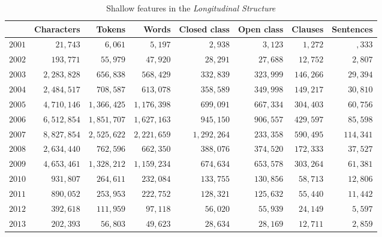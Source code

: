 \begin{table}[htb]
\centering
\small
\begin{tabular}{lrrrrrrr}
\toprule
{} &  Characters &   Tokens &    Words &  Closed class &  Open class &  Clauses &  Sentences \\
\midrule
$2001$ &    $   21,743$ &  $   6,061  $ &  $    5,197   $ &    $    2,938$  &   $     3,123$ &   $  1,272$ &  $   ,333 $  \\
$2002$ &    $  193,771$ &  $  55,979  $ &  $   47,920   $ &    $   28,291$  &   $    27,688$ &   $ 12,752$ &  $  2,807$  \\
$2003$ &    $ 2,283,828$ & $ 656,838  $ &  $  568,429   $ &    $  332,839$  &   $   323,999$ &   $146,266$ &  $ 29,394$  \\
$2004$ &    $ 2,484,517$ & $ 708,587  $ &  $  613,078   $ &    $  358,589$  &   $   349,998$ &   $149,217$ &  $ 30,810$  \\
$2005$ &    $ 4,710,146$ & $1,366,425 $ &  $  1,176,398  $ &    $   699,091$  &   $   667,334$ &   $304,403$ &  $ 60,756$  \\
$2006$ &    $ 6,512,854$ & $1,851,707 $ &  $  1,627,163  $ &    $   945,150$  &   $   906,557$ &   $429,597$ &  $ 85,598$  \\
$2007$ &    $ 8,827,854$ & $2,525,622 $ &  $  2,221,659  $ &    $  1,292,264$  &   $   233,358$ &   $590,495$ &  $114,341$  \\
$2008$ &    $ 2,634,440$ & $ 762,596  $ &  $  662,350   $ &    $  388,076$  &   $   374,520$ &   $172,333$ &  $ 37,527$  \\
$2009$ &    $ 4,653,461$ & $1,328,212 $ &  $  1,159,234  $ &    $   674,634$  &   $   653,578$ &   $303,264$ &  $ 61,381$  \\
$2010$ &    $  931,807$ &  $ 264,611  $ &  $  232,084   $ &    $  133,755$  &   $   130,856$ &   $ 58,713$ &  $ 12,806$  \\
$2011$ &    $  890,052$ &  $ 253,953  $ &  $  222,752   $ &    $  128,321$  &   $   125,632$ &   $ 55,440$ &  $ 11,442$  \\
$2012$ &    $  392,618$ &  $ 111,959  $ &  $   97,118   $ &    $   56,020$  &   $    55,939$ &   $ 24,149$ &  $  5,597$  \\
$2013$ &    $  202,393$ &  $  56,803  $ &  $   49,623   $ &    $   28,634$  &   $    28,169$ &   $ 12,711$ &  $  2,859$  \\
\bottomrule
\end{tabular}
\caption{Shallow features in the \emph{Longitudinal Structure}}
\label{tab:shallow_L}
\end{table}

